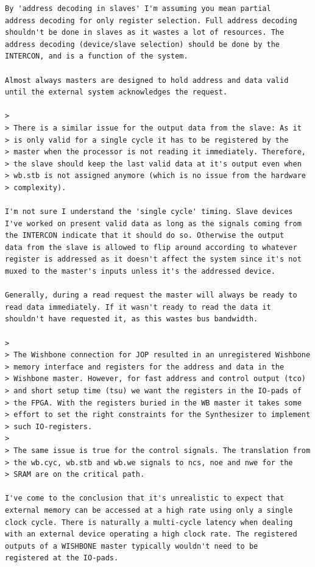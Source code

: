 \documentclass[a4paper,12pt]{scrartcl}
\begin{document}
\begin{verbatim}
By 'address decoding in slaves' I'm assuming you mean partial
address decoding for only register selection. Full address decoding
shouldn't be done in slaves as it wastes a lot of resources. The
address decoding (device/slave selection) should be done by the
INTERCON, and is a function of the system.

Almost always masters are designed to hold address and data valid
until the external system acknowledges the request.

>
> There is a similar issue for the output data from the slave: As it
> is only valid for a single cycle it has to be registered by the
> master when the processor is not reading it immediately. Therefore,
> the slave should keep the last valid data at it's output even when
> wb.stb is not assigned anymore (which is no issue from the hardware
> complexity).

I'm not sure I understand the 'single cycle' timing. Slave devices
I've worked on present valid data as long as the signals coming from
the INTERCON indicate that it should do so. Otherwise the output
data from the slave is allowed to flip around according to whatever
register is addressed as it doesn't affect the system since it's not
muxed to the master's inputs unless it's the addressed device.

Generally, during a read request the master will always be ready to
read data immediately. If it wasn't ready to read the data it
shouldn't have requested it, as this wastes bus bandwidth.

>
> The Wishbone connection for JOP resulted in an unregistered Wishbone
> memory interface and registers for the address and data in the
> Wishbone master. However, for fast address and control output (tco)
> and short setup time (tsu) we want the registers in the IO-pads of
> the FPGA. With the registers buried in the WB master it takes some
> effort to set the right constraints for the Synthesizer to implement
> such IO-registers.
>
> The same issue is true for the control signals. The translation from
> the wb.cyc, wb.stb and wb.we signals to ncs, noe and nwe for the
> SRAM are on the critical path.

I've come to the conclusion that it's unrealistic to expect that
external memory can be accessed at a high rate using only a single
clock cycle. There is naturally a multi-cycle latency when dealing
with an external device operating a high clock rate. The registered
outputs of a WISHBONE master typically wouldn't need to be
registered at the IO-pads.


\end{verbatim}
\end{document}
